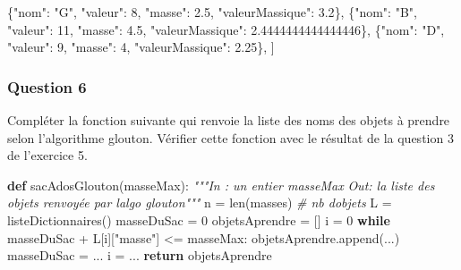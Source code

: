 \documentclass[
  paper=a4,
  ,captions=tableheading
]{scrartcl}
\newenvironment{Shaded}{}{}
\newcommand{\BuiltInTok}[1]{\textcolor[rgb]{0.00,0.50,0.00}{#1}}
\newcommand{\CommentTok}[1]{\textcolor[rgb]{0.38,0.63,0.69}{\textit{#1}}}
\newcommand{\ControlFlowTok}[1]{\textcolor[rgb]{0.00,0.44,0.13}{\textbf{#1}}}
\newcommand{\DecValTok}[1]{\textcolor[rgb]{0.25,0.63,0.44}{#1}}
\newcommand{\FloatTok}[1]{\textcolor[rgb]{0.25,0.63,0.44}{#1}}
\newcommand{\KeywordTok}[1]{\textcolor[rgb]{0.00,0.44,0.13}{\textbf{#1}}}
\newcommand{\NormalTok}[1]{#1}
\newcommand{\OperatorTok}[1]{\textcolor[rgb]{0.40,0.40,0.40}{#1}}
\newcommand{\StringTok}[1]{\textcolor[rgb]{0.25,0.44,0.63}{#1}}
\begin{document}
\begin{Shaded}
\begin{Highlighting}[]
\NormalTok{    \{}\StringTok{"nom"}\NormalTok{: }\StringTok{"G"}\NormalTok{, }\StringTok{"valeur"}\NormalTok{: }\DecValTok{8}\NormalTok{, }\StringTok{"masse"}\NormalTok{: }\FloatTok{2.5}\NormalTok{, }\StringTok{"valeurMassique"}\NormalTok{: }\FloatTok{3.2}\NormalTok{\},}
\NormalTok{    \{}\StringTok{"nom"}\NormalTok{: }\StringTok{"B"}\NormalTok{, }\StringTok{"valeur"}\NormalTok{: }\DecValTok{11}\NormalTok{, }\StringTok{"masse"}\NormalTok{: }\FloatTok{4.5}\NormalTok{, }\StringTok{"valeurMassique"}\NormalTok{: }\FloatTok{2.4444444444444446}\NormalTok{\},}
\NormalTok{    \{}\StringTok{"nom"}\NormalTok{: }\StringTok{"D"}\NormalTok{, }\StringTok{"valeur"}\NormalTok{: }\DecValTok{9}\NormalTok{, }\StringTok{"masse"}\NormalTok{: }\DecValTok{4}\NormalTok{, }\StringTok{"valeurMassique"}\NormalTok{: }\FloatTok{2.25}\NormalTok{\},}
\NormalTok{]}
\end{Highlighting}
\end{Shaded}

\hypertarget{question-6}{%
\subsubsection{Question 6}\label{question-6}}

Compléter la fonction suivante qui renvoie la liste des noms des objets
à prendre selon l'algorithme glouton. Vérifier cette fonction avec le
résultat de la question 3 de l'exercice 5.

\begin{Shaded}
\begin{Highlighting}[]
\KeywordTok{def}\NormalTok{ sacAdosGlouton(masseMax):}
    \CommentTok{"""In : un entier masseMax}
\CommentTok{    Out: la liste des objets renvoyée par l\textquotesingle{}algo glouton"""}
\NormalTok{    n }\OperatorTok{=} \BuiltInTok{len}\NormalTok{(masses)  }\CommentTok{\# nb d\textquotesingle{}objets}
\NormalTok{    L }\OperatorTok{=}\NormalTok{ listeDictionnaires()}
\NormalTok{    masseDuSac }\OperatorTok{=} \DecValTok{0}
\NormalTok{    objetsAprendre }\OperatorTok{=}\NormalTok{ []}
\NormalTok{    i }\OperatorTok{=} \DecValTok{0}
    \ControlFlowTok{while}\NormalTok{ masseDuSac }\OperatorTok{+}\NormalTok{ L[i][}\StringTok{"masse"}\NormalTok{] }\OperatorTok{\textless{}=}\NormalTok{ masseMax:}
\NormalTok{        objetsAprendre.append(...)}
\NormalTok{        masseDuSac }\OperatorTok{=}\NormalTok{ ...}
\NormalTok{        i }\OperatorTok{=}\NormalTok{ ...}
    \ControlFlowTok{return}\NormalTok{ objetsAprendre}
\end{Highlighting}
\end{Shaded}
\end{document}
